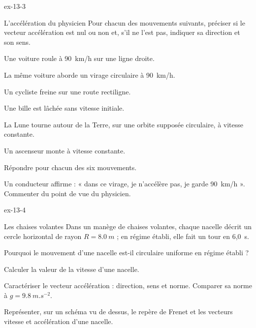 \begin{blocLivre}{ex-13-3}
\begin{exercice}[1]{L'accélération du physicien}
Pour chacun des mouvements suivants, préciser si le vecteur accélération est nul ou non et, s'il ne l'est pas,
indiquer sa direction et son sens.
\begin{questions}[label=\otLabel{\alph*.},leftmargin=1.9em,itemsep=0pt,parsep=0.15em]
\item Une voiture roule à 90~km/h sur une ligne droite.
\item La même voiture aborde un virage circulaire à 90~km/h.
\item Un cycliste freine sur une route rectiligne.
\item Une bille est lâchée sans vitesse initiale.
\item La Lune tourne autour de la Terre, sur une orbite supposée circulaire, à vitesse constante.
\item Un ascenseur monte à vitesse constante.
\end{questions}
\begin{questions}
\item Répondre pour chacun des six mouvements.
\item Un conducteur affirme : « dans ce virage, je n'accélère pas, je garde 90~km/h ». Commenter du point de vue du
physicien.
\end{questions}
\end{exercice}
\end{blocLivre}
\begin{blocLivre}{ex-13-4}
\begin{exercice}[1]{Les chaises volantes}
Dans un manège de chaises volantes, chaque nacelle décrit un cercle horizontal de rayon $R=\qty{8,0}{m}$ ; en régime
établi, elle fait un tour en 6,0~s.
\begin{questions}
\item Pourquoi le mouvement d'une nacelle est-il circulaire uniforme en régime établi ?
\item Calculer la valeur de la vitesse d'une nacelle.
\item Caractériser le vecteur accélération : direction, sens et norme. Comparer sa norme à $g=\qty{9,8}{m.s^{-2}}$.
\item Représenter, sur un schéma vu de dessus, le repère de Frenet et les vecteurs vitesse et accélération d'une
nacelle.
\end{questions}
\end{exercice}
\end{blocLivre}
